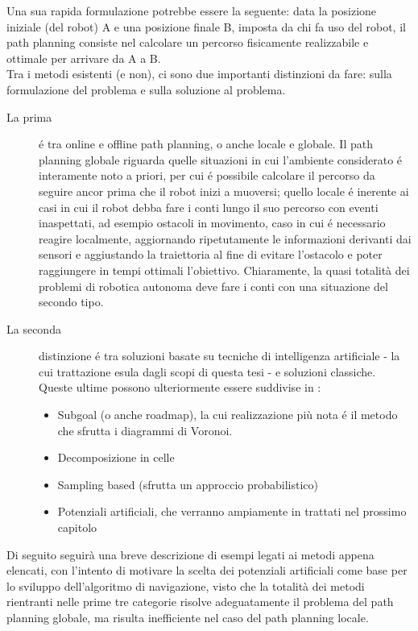 \documentclass[14pt,a4paper]{extarticle}
\begin{document}
Una sua rapida formulazione potrebbe essere la seguente: data la posizione iniziale (del robot) A e una posizione finale B, imposta da chi fa uso del robot, il path planning consiste nel calcolare un percorso fisicamente realizzabile e ottimale per arrivare da A a B.\\
Tra i metodi esistenti (e non), ci sono due importanti distinzioni da fare: sulla formulazione del problema e sulla soluzione al problema.
\begin{description}
\item[La prima] é tra online e offline path planning, o anche locale e globale. Il path planning globale riguarda quelle situazioni in cui l'ambiente considerato é interamente noto a priori, per cui é possibile calcolare il percorso da seguire ancor prima che il robot inizi a muoversi; quello locale é inerente ai casi in cui il robot debba fare i conti lungo il suo percorso con eventi inaspettati, ad esempio ostacoli in movimento, caso in cui é necessario reagire localmente, aggiornando ripetutamente le informazioni derivanti dai sensori e aggiustando la traiettoria al fine di evitare l'ostacolo e poter raggiungere in tempi ottimali l'obiettivo. Chiaramente, la quasi totalità dei problemi di robotica autonoma deve fare i conti con una situazione del secondo tipo. 
\item[La seconda] distinzione é tra soluzioni basate su tecniche di intelligenza artificiale - la cui trattazione esula dagli scopi di questa tesi - e soluzioni classiche. Queste ultime possono ulteriormente essere suddivise in \cite{siciliano}:
\begin{itemize}
\item Subgoal (o anche roadmap), la cui realizzazione più nota é il metodo che sfrutta i diagrammi di Voronoi. 
\item Decomposizione in celle
\item Sampling based (sfrutta un approccio probabilistico)
\item Potenziali artificiali, che verranno ampiamente in trattati nel prossimo capitolo
\end{itemize}
\end{description}
Di seguito seguirà una breve descrizione di esempi legati ai metodi appena elencati, con l'intento di motivare la scelta dei potenziali artificiali come base per lo sviluppo dell'algoritmo di navigazione, visto che la totalità dei metodi rientranti nelle prime tre categorie risolve adeguatamente il problema del path planning globale, ma risulta inefficiente nel caso del path planning locale. 
\end{document}
